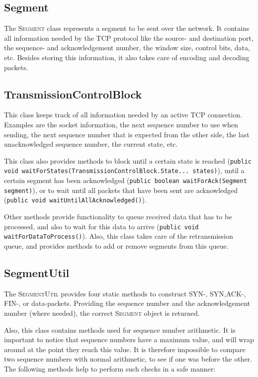 \documentclass{hitec}
\newcommand{\classname}[1]{\textsc{#1}}
\newcommand{\methodname}[1]{\texttt{#1}}
\begin{document}
\subsection{Segment}
The \classname{Segment} class represents a segment to be sent over the network. It contains all information needed by the TCP protocol like the source- and destination port, the sequence- and acknowledgement number, the window size, control bits, data, etc. Besides storing this information, it also takes care of encoding and decoding packets.

\subsection{TransmissionControlBlock}
This class keeps track of all information needed by an active TCP connection. Examples are the socket information, the next sequence number to use when sending, the next sequence number that is expected from the other side, the last unacknowledged sequence number, the current state, etc.

This class also provides methods to block until a certain state is reached (\methodname{public void waitForStates(TransmissionControlBlock.State... states)}), until a certain segment has been acknowledged (\methodname{public boolean waitForAck(Segment segment)}), or to wait until all packets that have been sent are acknowledged (\methodname{public void waitUntilAllAcknowledged()}).

Other methods provide functionality to queue received data that has to be processed, and also to wait for this data to arrive (\methodname{public void waitForDataToProcess()}). Also, this class takes care of the retransmission queue, and provides methods to add or remove segments from this queue.

\subsection{SegmentUtil}
The \classname{SegmentUtil} provides four static methods to construct SYN-, SYN,ACK-, FIN-, or data-packets. Providing the sequence number and the acknowledgement number (where needed), the correct \classname{Segment} object is returned. 

Also, this class contains methods used for sequence number arithmetic. It is important to notice that sequence numbers have a maximum value, and will wrap around at the point they reach this value. It is therefore impossible to compare two sequence numbers with normal arithmetic, to see if one was before the other. The following methods help to perform such checks in a safe manner:
\end{document}
